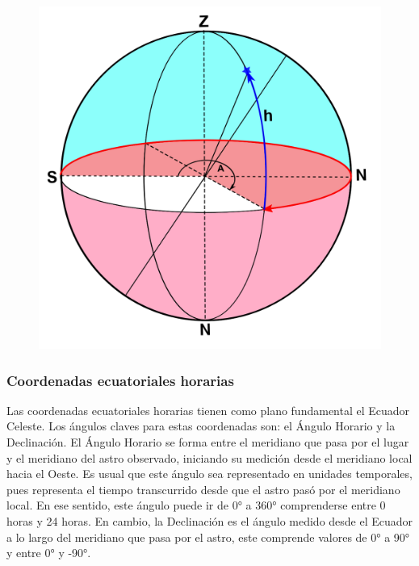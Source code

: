 \documentclass[10pt,a4paper]{article}
\begin{document}
\begin{figure}[H]
\centering
\includegraphics[scale=0.3]{Imagenes/C_horizontales_01}
\end{figure}


\subsubsection{Coordenadas ecuatoriales horarias}
Las coordenadas ecuatoriales horarias tienen como plano fundamental el Ecuador Celeste. Los ángulos claves para estas coordenadas son: el Ángulo Horario y la Declinación. El Ángulo Horario se forma entre el meridiano que pasa por el lugar y el meridiano del astro observado, iniciando su medición desde el meridiano local hacia el Oeste. Es usual que este ángulo sea representado en unidades temporales, pues representa el tiempo transcurrido desde que el astro pasó por el meridiano local. En ese sentido, este ángulo puede ir de 0° a 360° comprenderse entre 0 horas y 24 horas. En cambio, la Declinación es el ángulo medido desde el Ecuador a lo largo del meridiano que pasa por el astro, este comprende valores de 0° a 90° y entre 0° y -90°.
\end{document}
